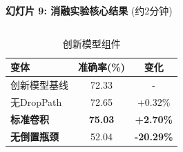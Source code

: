 \documentclass[10pt]{beamer}
\begin{document}
\begin{frame}{\textbf{幻灯片 9: 消融实验核心结果} (约2分钟)}
\begin{columns}[T]
\begin{column}{0.49\textwidth}
        \vspace{0.5em}
        \begin{table}[h]
        \centering
        {\scriptsize
        \begin{tabular}{|l|c|c|}
        \hline
        变体 & 准确率(\%) & 变化 \\
        \hline
        创新模型基线 & 72.33 & - \\
        无DropPath & 72.65 & +0.32\% \\
        \textbf{标准卷积} & \textbf{75.03} & \textbf{+2.70\%} \\
        \textbf{无倒置瓶颈} & 52.04 & \textbf{-20.29\%} \\
        \hline
        \end{tabular}
        \caption{创新模型组件}}
        \end{table}
    \end{column}
\end{columns}

\end{frame}
\end{document}

